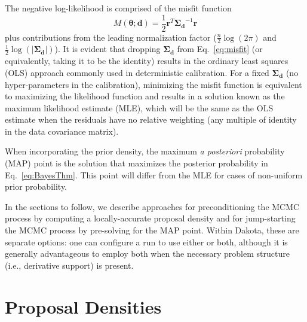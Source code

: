 The negative log-likelihood is comprised of the misfit function
\begin{equation}
M(\boldsymbol{\theta;d}) 
  = \frac{1}{2} \boldsymbol{r}^T \boldsymbol{\Sigma_d}^{-1} \boldsymbol{r}
\label{eq:misfit}
\end{equation}
plus contributions from the leading normalization factor
($\frac{n}{2}\log(2\pi)$ and $\frac{1}{2}\log(|\boldsymbol{\Sigma_d}|)$).  
It is evident that dropping $\boldsymbol{\Sigma_d}$ from
Eq.~\ref{eq:misfit} (or equivalently, taking it to be the identity)
results in the ordinary least squares (OLS) approach commonly used in
deterministic calibration.  For a fixed $\boldsymbol{\Sigma_d}$ (no
hyper-parameters in the calibration), minimizing the misfit function 
is equivalent to maximizing the likelihood function and results in a
solution known as the maximum likelihood estimate (MLE), which will be
the same as the OLS estimate when the residuals have no relative
weighting (any multiple of identity in the data covariance matrix).

When incorporating the prior density, the maximum {\it a posteriori}
probability (MAP) point is the solution that maximizes the posterior
probability in Eq.~\ref{eq:BayesThm}.  This point will differ
from the MLE for cases of non-uniform prior probability.


In the sections to follow, we describe approaches for preconditioning the
MCMC process by computing a locally-accurate proposal density 
and for jump-starting the MCMC process by pre-solving for the MAP point.
Within Dakota, these are separate options: one can configure a run to use
either or both, although it is generally advantageous to employ both
when the necessary problem structure (i.e., derivative support) is present.


\section{Proposal Densities} \label{uq:bayes:prop}

